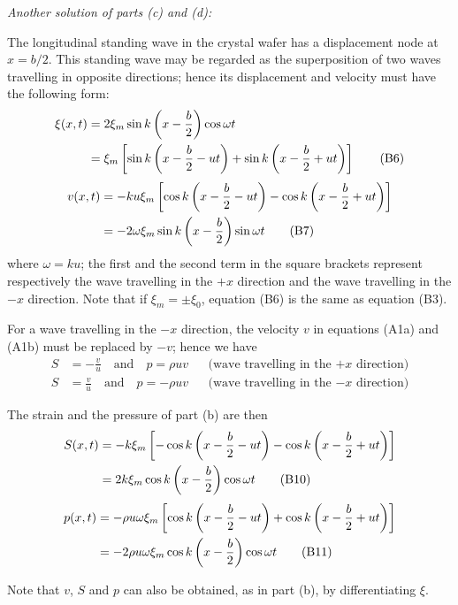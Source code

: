 \emph{Another solution of parts (c) and (d):}

The longitudinal standing wave in the crystal wafer has a displacement node at $x=b/2$. This standing wave may be regarded as the superposition of two waves travelling in opposite directions; hence its displacement and velocity must have the following form:
\begin{align}
\xi(x,t) &= 2\xi_m\sin k\left(x-\frac{b}{2}\right)\cos\omega t\notag\\
&= \xi_m\left[\sin k\left(x-\frac{b}{2}-ut\right)+\sin k\left(x-\frac{b}{2}+ut\right)\right] \tag{B6}
\end{align}
\begin{align}
v(x,t) &= -ku\xi_m\left[\cos k\left(x-\frac{b}{2}-ut\right)-\cos k\left(x-\frac{b}{2}+ut\right)\right]\notag\\
&= -2\omega\xi_m\sin k\left(x-\frac{b}{2}\right)\sin\omega t \tag{B7}
\end{align}
where $\omega=ku$; the first and the second term in the square brackets represent respectively the wave travelling in the $+x$ direction and the wave travelling in the $-x$ direction. Note that if $\xi_m=\pm\xi_0$, equation (B6) is the same as equation (B3).

For a wave travelling in the $-x$ direction, the velocity $v$ in equations (A1a) and (A1b) must be replaced by $-v$; hence we have
\begin{align}
S &= -\frac{v}{u}\quad\text{and}\quad p=\rho uv &&\text{(wave travelling in the $+x$ direction)} \tag{B8}\\
S &= \frac{v}{u}\quad\text{and}\quad p=-\rho uv &&\text{(wave travelling in the $-x$ direction)} \tag{B9}
\end{align}

The strain and the pressure of part (b) are then
\begin{align}
S(x,t) &= -k\xi_m\left[-\cos k\left(x-\frac{b}{2}-ut\right)-\cos k\left(x-\frac{b}{2}+ut\right)\right]\notag\\
&= 2k\xi_m\cos k\left(x-\frac{b}{2}\right)\cos\omega t \tag{B10}
\end{align}
\begin{align}
p(x,t) &= -\rho u\omega\xi_m\left[\cos k\left(x-\frac{b}{2}-ut\right)+\cos k\left(x-\frac{b}{2}+ut\right)\right]\notag\\
&= -2\rho u\omega\xi_m\cos k\left(x-\frac{b}{2}\right)\cos\omega t \tag{B11}
\end{align}

Note that $v$, $S$ and $p$ can also be obtained, as in part (b), by differentiating $\xi$.

